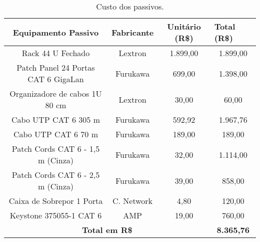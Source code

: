 \begin{table}[h!]
		\begin{center}
	\caption{Custo dos passivos.}
	\label{tab10}
	\renewcommand{\arraystretch}{1.2}
\begin{tabular}{|c|c|c|c|}
	\hline
	\textbf{Equipamento Passivo}                 & \textbf{Fabricante} & \textbf{ Unitário (R\$)} & \multicolumn{1}{l|}{\textbf{Total (R\$)}} \\ \hline
	Rack 44 U Fechado                            & Lextron             & 1.899,00                         & 1.899,00                                           \\ \hline
	Patch Panel 24 Portas CAT 6 GigaLan  & Furukawa            & 699,00                           & 1.398,00                                           \\ \hline
	Organizadore de cabos 1U 80 cm               & Lextron             & 30,00                            & 60,00                                              \\ \hline
	Cabo UTP CAT 6  305 m           & Furukawa            & 592,92                           & 1.967,76                                           \\ \hline
	Cabo UTP CAT 6  70 m            & Furukawa            & 189,00                           & 189,00                                             \\ \hline
	Patch Cords CAT 6 - 1,5 m (Cinza)            & Furukawa            & 32,00                            & 1.114,00                                           \\ \hline
	Patch Cords CAT 6 - 2,5 m (Cinza)            & Furukawa            & 39,00                            & 858,00                                             \\ \hline
	Caixa de Sobrepor 1 Porta                          & C. Network                & 4,80                             & 120,00                                             \\ \hline
	Keystone 375055-1
	CAT 6                             & AMP                 & 19,00                            & 760,00                                             \\ \hline
	\multicolumn{3}{|c|}{\textbf{Total em R\$}}                                                           & \textbf{8.365,76}                                  \\ \hline
\end{tabular}
\end{center}
\end{table}